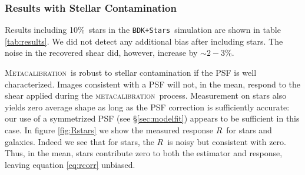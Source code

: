 \documentclass[iop]{emulateapj}
\newcommand{\snr}{$S/N$}
\newcommand{\mcal}{\textsc{metacalibration}}
\newcommand{\Mcal}{\textsc{Metacalibration}}
\newcommand{\mcalR}{\mbox{\boldmath $R$}}
\newcommand{\nsimNstarperc}{10\%}
\newcommand{\starnoiseincrease}{$\sim 2-3$\%}
\newcommand{\bdstar}{\texttt{BDK+Stars}}
\begin{document}

\subsubsection{Results with Stellar Contamination} \label{sec:stars}

Results including \nsimNstarperc\ stars in the \bdstar\ simulation are shown in
table \ref{tab:results}. We did not detect any additional bias after including
stars. The noise in the recovered shear did, however, increase by
\starnoiseincrease.

\Mcal\ is robust to stellar contamination if the PSF is well characterized.
Images consistent with a PSF will not, in the mean, respond to the shear
applied during the \mcal\ process.  Measurement on stars also yields zero
average shape as long as the PSF correction is sufficiently accurate: our use
of a symmetrized PSF (see \S \ref{sec:modelfit}) appears to be sufficient in
this case.  In figure \ref{fig:Rstars} we show the measured response \mcalR\
for stars and galaxies.  Indeed we see that for stars, the \mcalR\ is noisy
but consistent with zero.  Thus, in the mean, stars contribute zero to both the
estimator and response, leaving equation \ref{eq:rcorr} unbiased.
\end{document}
